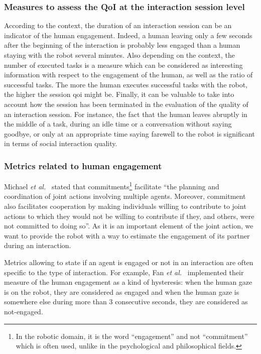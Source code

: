 \documentclass[a4paper,11pt,twoside]{StyleThese}
\begin{document}
\subsubsection{Measures to assess the QoI at the interaction session level}\label{subsec:m_intersess}
According to the context, the duration of an interaction session can be an indicator of the human engagement. Indeed, a human leaving only a few seconds after the beginning of the interaction is probably less engaged than a human staying with the robot several minutes. Also depending on the context, the number of executed tasks is a measure which can be considered as interesting information with respect to the engagement of the human, as well as the ratio of successful tasks. The more the human executes successful tasks with the robot, the higher the session \acrshort{qoi} might be. Finally, it can be valuable to take into account how the session has been terminated in the evaluation of the quality of an interaction session. For instance, the fact that the human leaves abruptly in the middle of a task, during an idle time or a conversation without saying goodbye, or only at an appropriate time saying farewell to the robot is significant in terms of social interaction quality.

\subsubsection{Metrics related to human engagement}\label{subsec:m_engag}
Michael \textit{et al.}~\cite{michael2016} stated that commitments\footnote{In the robotic domain, it is the word ``engagement'' and not ``commitment'' which is often used, unlike in the psychological and philosophical fields.} facilitate ``the planning and coordination of joint actions involving multiple agents. Moreover, commitment also facilitates cooperation by making individuals willing to contribute to joint actions to which they would not be willing to contribute if they, and others, were not committed to doing so''. As it is an important element of the joint action, we want to provide the robot with a way to estimate the engagement of its partner during an interaction. 

Metrics allowing to state if an agent is engaged or not in an interaction are often specific to the type of interaction. For example, Fan \textit{et al.}~\cite{fan2017} implemented their measure of the human engagement as a kind of hysteresis: when the human gaze is on the robot, they are considered as engaged and when the human gaze is somewhere else during more than 3 consecutive seconds, they are considered as not-engaged. 
\end{document}
